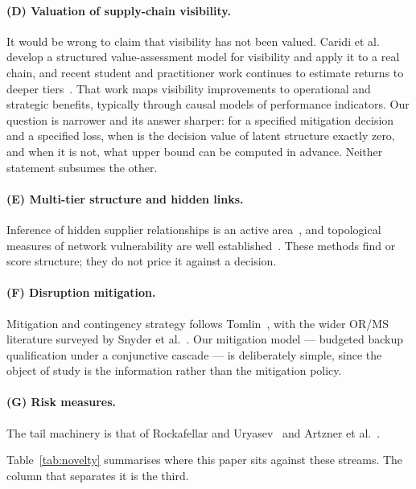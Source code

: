\documentclass[pdflatex,sn-mathphys-num]{sn-jnl}
\theoremstyle{thmstyleone}
\theoremstyle{thmstyletwo}
\theoremstyle{thmstylethree}
\begin{document}
\paragraph{(D) Valuation of supply-chain visibility.} It would be wrong to
claim that visibility has not been valued. Caridi et al.~\cite{caridi2014}
develop a structured value-assessment model for visibility and apply it to a
real chain, and recent student and practitioner work continues to estimate
returns to deeper tiers~\cite{cermeno2026}. That work maps visibility improvements to
operational and strategic benefits, typically through causal models of
performance indicators. Our question is narrower and its answer sharper: for
a specified mitigation decision and a specified loss, when is the decision
value of latent structure exactly zero, and when it is not, what upper bound
can be computed in advance. Neither statement subsumes the other.

\paragraph{(E) Multi-tier structure and hidden links.} Inference of hidden
supplier relationships is an active area~\cite{brintrup2018,kosasih2022},
and topological measures of network vulnerability are well
established~\cite{wagner2010,simchi2015}. These methods find or score
structure; they do not price it against a decision.

\paragraph{(F) Disruption mitigation.} Mitigation and contingency strategy
follows Tomlin~\cite{tomlin2006}, with the wider OR/MS literature surveyed
by Snyder et al.~\cite{snyder2016}. Our mitigation model --- budgeted backup
qualification under a conjunctive cascade --- is deliberately simple, since
the object of study is the information rather than the mitigation policy.

\paragraph{(G) Risk measures.} The tail machinery is that of Rockafellar and
Uryasev~\cite{rockafellar2000} and Artzner et al.~\cite{artzner1999}.

Table~\ref{tab:novelty} summarises where this paper sits against these
streams. The column that separates it is the third.
\end{document}

